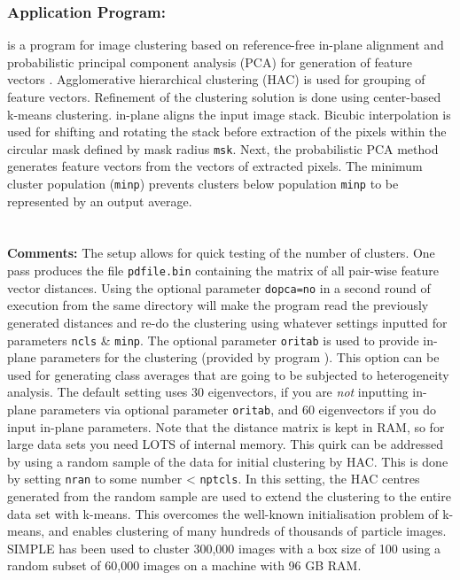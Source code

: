 \subsubsection{Application Program: }
\label{cluster}
 is a program for image clustering based on reference-free in-plane alignment \citep{Penczek:1992aa} and probabilistic principal component analysis (PCA) for generation of feature vectors \citep{Bishop:2006}. Agglomerative hierarchical clustering (HAC) is used for grouping of feature vectors. Refinement of the clustering solution is done using center-based k-means clustering.  in-plane aligns the input image stack. Bicubic interpolation is used for shifting and rotating the stack before extraction of the pixels within the circular mask defined by mask radius \texttt{msk}. Next, the probabilistic PCA method generates feature vectors from the vectors of extracted pixels. The minimum cluster population (\texttt{minp}) prevents clusters below population \texttt{minp} to be represented by an output average.\\
\shellctd{clusters> msk=<mask radius(in pixels)> oritab=<PRIME3D doc> [nthr=<nr of openMP}
\shellctd{threads\{1\}>]}
\shellctd{[nvars=<nr of eigen vectors\{30\}>]}
\\\\
\noindent\textbf{Comments:} The setup allows for quick testing of the number of clusters. One pass produces the file \texttt{pdfile.bin} containing the matrix of all pair-wise feature vector distances. Using the optional parameter \texttt{dopca=no} in a second round of execution from the same directory will make the program read the previously generated distances and re-do the clustering using whatever settings inputted for parameters \texttt{ncls} \& \texttt{minp}. The optional parameter \texttt{oritab} is used to provide in-plane parameters for the clustering (provided by program ). This option can be used for generating class averages that are going to be subjected to heterogeneity analysis. The default setting uses 30 eigenvectors, if you are \textit{not} inputting in-plane parameters via optional parameter \texttt{oritab}, and 60 eigenvectors if you do input in-plane parameters. Note that the distance matrix is kept in RAM, so for large data sets you need LOTS of internal memory. This quirk can be addressed by using a random sample of the data for initial clustering by HAC. This is done by setting \texttt{nran} to some number < \texttt{nptcls}. In this setting, the HAC centres generated from the random sample are used to extend the clustering to the entire data set with k-means. This overcomes the well-known initialisation problem of k-means, and enables clustering of many hundreds of thousands of particle images. SIMPLE has been used to cluster 300,000 images with a box size of 100 using a random subset of 60,000 images on a machine with 96 GB RAM.

